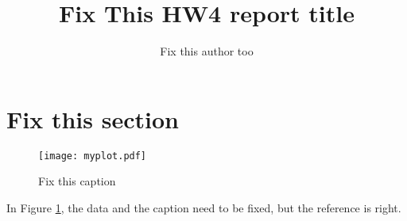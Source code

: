 \documentclass{article}
\title{Fix This HW4 report title}
\author{Fix this author too}
\begin{document}
\maketitle

\section{Fix this section}
\begin{figure}[h]
  \centering
  \texttt{[image: myplot.pdf]}
  \caption{Fix this caption}
  \label{f:myplotfig}
\end{figure}

In Figure \ref{f:myplotfig}, the data and the caption need to be fixed, but the reference is right.
\end{document}
